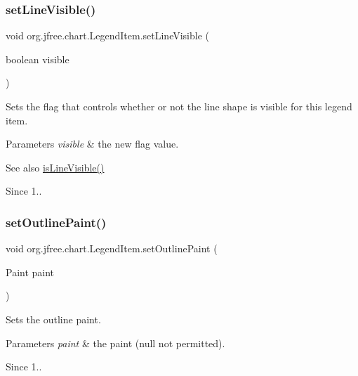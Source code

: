 \subsubsection{\texorpdfstring{set\+Line\+Visible()}{setLineVisible()}}
{\footnotesize\ttfamily void org.\+jfree.\+chart.\+Legend\+Item.\+set\+Line\+Visible (\begin{DoxyParamCaption}\item[{boolean}]{visible }\end{DoxyParamCaption})}

Sets the flag that controls whether or not the line shape is visible for this legend item.


\begin{DoxyParams}{Parameters}
{\em visible} & the new flag value.\\
\hline
\end{DoxyParams}
\begin{DoxySeeAlso}{See also}
\mbox{\hyperlink{classorg_1_1jfree_1_1chart_1_1_legend_item_af99c8d8cee770e72ecddaf3b2cf467b1}{is\+Line\+Visible()}} 
\end{DoxySeeAlso}
\begin{DoxySince}{Since}
1.. 
\end{DoxySince}
\mbox{\label{classorg_1_1jfree_1_1chart_1_1_legend_item_a6077fa4d19eaa39e0b688c74bd25c468}} 
\subsubsection{\texorpdfstring{set\+Outline\+Paint()}{setOutlinePaint()}}
{\footnotesize\ttfamily void org.\+jfree.\+chart.\+Legend\+Item.\+set\+Outline\+Paint (\begin{DoxyParamCaption}\item[{Paint}]{paint }\end{DoxyParamCaption})}

Sets the outline paint.


\begin{DoxyParams}{Parameters}
{\em paint} & the paint ({\ttfamily null} not permitted).\\
\hline
\end{DoxyParams}
\begin{DoxySince}{Since}
1.. 
\end{DoxySince}
\mbox{\label{classorg_1_1jfree_1_1chart_1_1_legend_item_a3a376b04acc776e2973de9f737713239}} 
